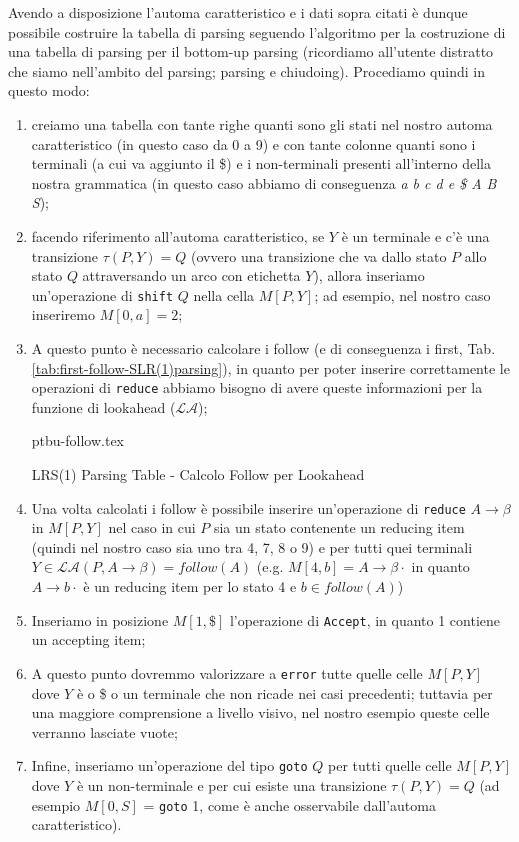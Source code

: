 \documentclass[class=book, crop=false, oneside, 12pt]{standalone}
\begin{document}
Avendo a disposizione l'automa caratteristico e i dati sopra citati è dunque possibile costruire la tabella di parsing seguendo l'algoritmo per la costruzione di una tabella di parsing per il bottom-up parsing (ricordiamo all'utente distratto che siamo nell'ambito del parsing; parsing e chiudoing). Procediamo quindi in questo modo:
\begin{enumerate}
    \item creiamo una tabella con tante righe quanti sono gli stati nel nostro automa caratteristico (in questo caso da 0 a 9) e con tante colonne quanti sono i terminali (a cui va aggiunto il \$) e i non-terminali presenti all'interno della nostra grammatica (in questo caso abbiamo di conseguenza \emph{a b c d e \$ A B S});
    \item facendo riferimento all'automa caratteristico, se \(Y\) è un terminale e c'è una transizione \(\tau (P, Y) = Q\) (ovvero una transizione che va dallo stato \(P\) allo stato \(Q\) attraversando un arco con etichetta \(Y\)), allora inseriamo un'operazione di \texttt{shift} \(Q\) nella cella \(M[P, Y]\); ad esempio, nel nostro caso inseriremo \(M[0, a] = 2\);
    \item A questo punto è necessario calcolare i follow (e di conseguenza i first, Tab.\ref{tab:first-follow-SLR(1)parsing}), in quanto per poter inserire correttamente le operazioni di \texttt{reduce} abbiamo bisogno di avere queste informazioni per la funzione di lookahead (\(\mathcal{LA}\));
\begin{table}[H]
    \centering
    {ptbu-follow.tex}
    \caption{LRS(1) Parsing Table - Calcolo Follow per Lookahead}
    \label{tab:first-follow-SLR(1)parsing}
\end{table}
    \item Una volta calcolati i follow è possibile inserire un'operazione di \texttt{reduce} \(A \rightarrow \beta\) in \(M[P, Y]\) nel caso in cui \(P\) sia un stato contenente un reducing item (quindi nel nostro caso sia uno tra 4, 7, 8 o 9) e per tutti quei terminali \(Y \in \mathcal{LA}(P, A \rightarrow \beta) = follow(A)\) (e.g. \(M[4, b] = A \rightarrow \beta \cdot\) in quanto \(A \rightarrow b \cdot\) è un reducing item per lo stato 4 e \(b \in follow(A)\))
    \item Inseriamo in posizione \(M[1, \$]\) l'operazione di \texttt{Accept}, in quanto 1 contiene un accepting item;
    \item A questo punto dovremmo valorizzare a \texttt{error} tutte quelle celle \(M[P, Y]\) dove \(Y\) è o \$ o un terminale che non ricade nei casi precedenti; tuttavia per una maggiore comprensione a livello visivo, nel nostro esempio queste celle verranno lasciate vuote;
    \item Infine, inseriamo un'operazione del tipo \texttt{goto} \(Q\) per tutti quelle celle \(M[P, Y]\) dove \(Y\) è un non-terminale e per cui esiste una transizione \(\tau(P, Y) = Q\) (ad esempio \(M[0, S]\) = \texttt{goto} 1, come è anche osservabile dall'automa caratteristico).
\end{enumerate}
\end{document}
